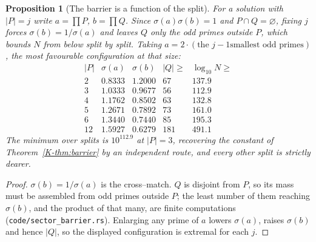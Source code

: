 \documentclass[11pt]{article}
\newtheorem{proposition}[theorem]{Proposition}
\theoremstyle{definition}
\begin{document}
\begin{proposition}[The barrier is a function of the split]\label{prop:sectorbarrier}
For a solution with $|P|=j$ write $a=\prod P$, $b=\prod Q$. Since $\sigma(a)\sigma(b)=1$ and
$P\cap Q=\varnothing$, fixing $j$ forces $\sigma(b)=1/\sigma(a)$ and leaves $Q$ only the odd primes
outside $P$, which bounds $N$ from below split by split. Taking $a=2\cdot(\text{the }j-1\text{
smallest odd primes})$, the most favourable configuration at that size:
\[
\begin{array}{r|cccc}
|P| & \sigma(a) & \sigma(b) & |Q|\ge & \log_{10}N\ge\\\hline
2 & 0.8333 & 1.2000 & 67 & 137.9\\
3 & 1.0333 & 0.9677 & 56 & 112.9\\
4 & 1.1762 & 0.8502 & 63 & 132.8\\
5 & 1.2671 & 0.7892 & 73 & 161.0\\
6 & 1.3440 & 0.7440 & 85 & 195.3\\
12 & 1.5927 & 0.6279 & 181 & 491.1
\end{array}
\]
The minimum over splits is $10^{112.9}$ at $|P|=3$, recovering the constant of
Theorem~\ref{K-thm:barrier} by an independent route, and every other split is strictly dearer.
\end{proposition}
\begin{proof}
$\sigma(b)=1/\sigma(a)$ is the cross--match. $Q$ is disjoint from $P$, so its mass must be assembled
from odd primes outside $P$; the least number of them reaching $\sigma(b)$, and the product of that
many, are finite computations (\texttt{code/sector\_barrier.rs}). Enlarging any prime of $a$ lowers
$\sigma(a)$, raises $\sigma(b)$ and hence $|Q|$, so the displayed configuration is extremal for each
$j$.
\end{proof}
\end{document}

